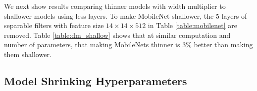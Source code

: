 \documentclass[10pt,twocolumn,letterpaper]{article}
\begin{document}
\begin{table}[t]
  \caption{Depthwise Separable vs Full Convolution MobileNet} %
\centering %
\end{table}

We next show results comparing thinner models with width multiplier to shallower models using less layers. To make MobileNet shallower, the $5$ layers of separable filters with feature size $14 \times 14 \times 512$ in Table \ref{table:mobilenet} are removed. Table \ref{table:dm_shallow} shows that at similar computation and number of parameters, that making MobileNets thinner is $3\%$ better than making them shallower.

\begin{table}[t]
  \caption{Narrow vs Shallow MobileNet} %
\centering %
\end{table}

\subsection{Model Shrinking Hyperparameters}
\end{document}
